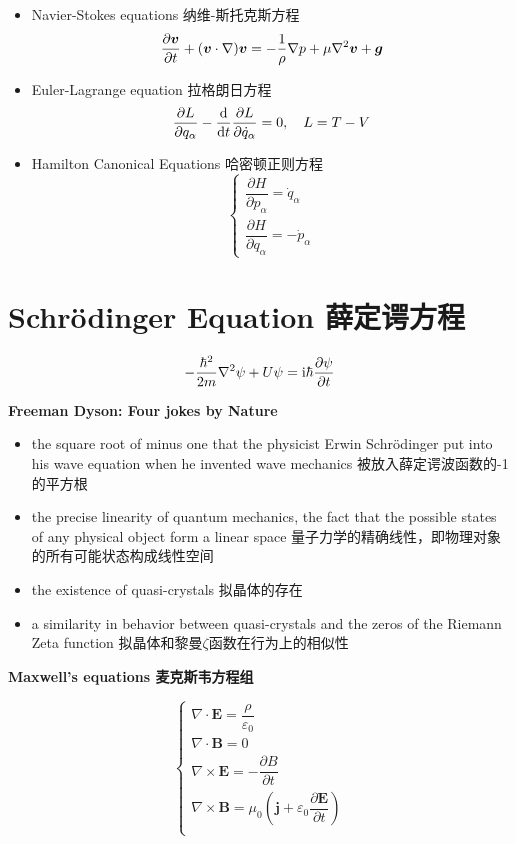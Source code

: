 \begin{itemize}
\tightlist{}
    \item
    Navier-Stokes equations 纳维-斯托克斯方程 \[ {\partial \boldsymbol v \over \partial t} +(\boldsymbol v \cdot \nabla) \boldsymbol v = - {1 \over \rho} \nabla p + \mu \nabla^2 \boldsymbol v + \boldsymbol g\]
    \item
    Euler-Lagrange equation 拉格朗日方程 \[{\partial L \over \partial q_\alpha}-{\mathrm d \over \mathrm dt} {\partial L \over \partial \dot q_\alpha}=0, \quad L=T-V\]
    \item
    Hamilton Canonical Equations 哈密顿正则方程 \[
    \left \{
    \begin{array}{l}
        \dfrac{\partial H}{\partial p_\alpha}=\dot q_\alpha \\[1.5ex]
        \dfrac{\partial H}{\partial q_\alpha}=-\dot p_\alpha
        \end{array}
    \right.
    \]
\end{itemize}

\section{Schrödinger Equation 薛定谔方程}\label{schruxf6dinger-equation-ux859bux5b9aux8c14ux65b9ux7a0b}

\[-{ \hbar^2 \over 2m } \nabla ^2 \psi + U \psi = \mathrm{i} \hbar {\partial \psi \over \partial t}\]

\textbf{Freeman Dyson: Four jokes by Nature}

\begin{itemize}
\tightlist{}
\item
  the square root of minus one that the physicist Erwin Schrödinger put into his wave equation when he invented wave mechanics 被放入薛定谔波函数的-1的平方根
\item
  the precise linearity of quantum mechanics, the fact that the possible states of any physical object form a linear space 量子力学的精确线性，即物理对象的所有可能状态构成线性空间
\item
  the existence of quasi-crystals 拟晶体的存在
\item
  a similarity in behavior between quasi-crystals and the zeros of the Riemann Zeta function 拟晶体和黎曼\(\zeta\)函数在行为上的相似性
\end{itemize}

\textbf{Maxwell's equations 麦克斯韦方程组}

\[
\left \{
    \begin{array} {l} 
        \nabla \cdot \boldsymbol E = \dfrac{\rho}{\varepsilon_0} \\
        \nabla \cdot \boldsymbol B = 0 \\
        \nabla \times \boldsymbol E = -\dfrac{\partial B}{\partial t} \\
        \nabla \times \boldsymbol B = \mu_0(\boldsymbol j+\varepsilon_0 \dfrac{\partial \boldsymbol E}{ \partial t}) \\
    \end{array} 
\right.
\]

